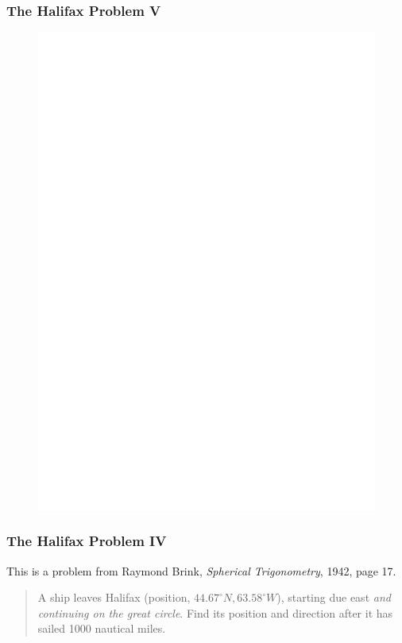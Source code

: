 \documentclass[xcolor=dvipsnames]{beamer}
\begin{document}
\begin{frame}
  \frametitle{The Halifax Problem V}
  \begin{figure}[h]
    \includegraphics[scale=.7]{./bcita-03.eps}
  \end{figure}
\end{frame}

\begin{frame}
  \frametitle{The Halifax Problem IV}
This is a problem from Raymond Brink, \emph{Spherical Trigonometry},
1942, page 17.
\begin{quote}
  A ship leaves Halifax (position, $44.67^{\circ}N,63.58^{\circ}W$),
  starting due east \emph{and continuing on the great circle}. Find its
  position and direction after it has sailed 1000 nautical miles.
\end{quote}
\end{frame}
\end{document}
